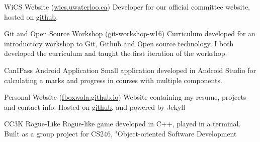 \documentclass[fontsize=10pt]{tccv}
\begin{document}
\begin{yearlist}

\item{}
    {WiCS Website (\href{http://wics.uwaterloo.ca}{wics.uwaterloo.ca})}
    {Developer for our official committee website, hosted on 
    \href{http://github.com/wics-uw/website}{github}.}\smallskip\\

\item{}
    {Git and Open Source Workshop (\href{http://github.com/wics-uw/git-workshop-w16}{git-workshop-w16})}
    {Curriculum developed for an introductory workshop to Git, Github and Open
        source technology. I both developed the curriculum and taught the first
    iteration of the workshop.}\smallskip\\

\item{}
     {CanIPass Android Application}
     {Small application developed in \textcolor{pank}{Android Studio} for calculating a marks
     and progress in courses with multiple components.}\smallskip\\

\item{}
    {Personal Website (\href{http://fboxwala.github.io}{fboxwala.github.io})}
     {Website containing my resume, projects and contact info. Hosted on 
     \href{http://github.com/fboxwala/fboxwala.github.io}{github}, and powered
 by \textcolor{pank}{Jekyll}}\smallskip\\

 \item{}
     {CC3K Rogue-Like}
     {Rogue-like game developed in \textcolor{pank}{C++}, played in a terminal. Built as a 
         group project for CS246, "Object-oriented Software Development}

 \end{yearlist}

 
\end{document}
